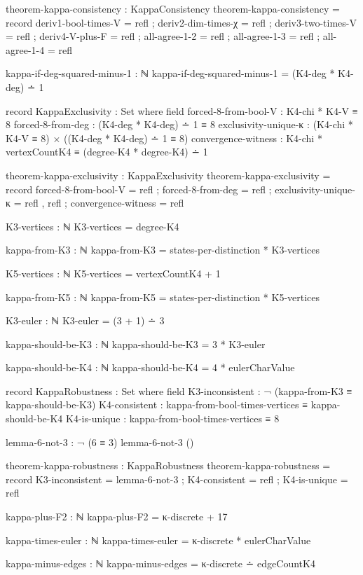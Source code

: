 \documentclass[11pt,a4paper]{book}
\begin{document}
\begin{code}
theorem-kappa-consistency : KappaConsistency
theorem-kappa-consistency = record
  { deriv1-bool-times-V  = refl
  ; deriv2-dim-times-χ   = refl
  ; deriv3-two-times-V   = refl
  ; deriv4-V-plus-F      = refl
  ; all-agree-1-2        = refl
  ; all-agree-1-3        = refl
  ; all-agree-1-4        = refl
  }


kappa-if-deg-squared-minus-1 : ℕ
kappa-if-deg-squared-minus-1 = (K4-deg * K4-deg) ∸ 1


record KappaExclusivity : Set where
  field
    forced-8-from-bool-V   : K4-chi * K4-V ≡ 8
    forced-8-from-deg      : (K4-deg * K4-deg) ∸ 1 ≡ 8
    exclusivity-unique-κ   : (K4-chi * K4-V ≡ 8) × ((K4-deg * K4-deg) ∸ 1 ≡ 8)
    convergence-witness    : K4-chi * vertexCountK4 ≡ (degree-K4 * degree-K4) ∸ 1

theorem-kappa-exclusivity : KappaExclusivity
theorem-kappa-exclusivity = record
  { forced-8-from-bool-V = refl
  ; forced-8-from-deg = refl
  ; exclusivity-unique-κ = refl , refl
  ; convergence-witness = refl
  }

K3-vertices : ℕ
K3-vertices = degree-K4

kappa-from-K3 : ℕ
kappa-from-K3 = states-per-distinction * K3-vertices

K5-vertices : ℕ
K5-vertices = vertexCountK4 + 1

kappa-from-K5 : ℕ
kappa-from-K5 = states-per-distinction * K5-vertices

K3-euler : ℕ
K3-euler = (3 + 1) ∸ 3


kappa-should-be-K3 : ℕ
kappa-should-be-K3 = 3 * K3-euler

kappa-should-be-K4 : ℕ
kappa-should-be-K4 = 4 * eulerCharValue

record KappaRobustness : Set where
  field
    K3-inconsistent : ¬ (kappa-from-K3 ≡ kappa-should-be-K3)
    K4-consistent   : kappa-from-bool-times-vertices ≡ kappa-should-be-K4
    K4-is-unique    : kappa-from-bool-times-vertices ≡ 8

lemma-6-not-3 : ¬ (6 ≡ 3)
lemma-6-not-3 ()

theorem-kappa-robustness : KappaRobustness
theorem-kappa-robustness = record
  { K3-inconsistent = lemma-6-not-3
  ; K4-consistent   = refl
  ; K4-is-unique    = refl
  }

kappa-plus-F2 : ℕ
kappa-plus-F2 = κ-discrete + 17

kappa-times-euler : ℕ
kappa-times-euler = κ-discrete * eulerCharValue

kappa-minus-edges : ℕ
kappa-minus-edges = κ-discrete ∸ edgeCountK4


\end{code}
\end{document}
